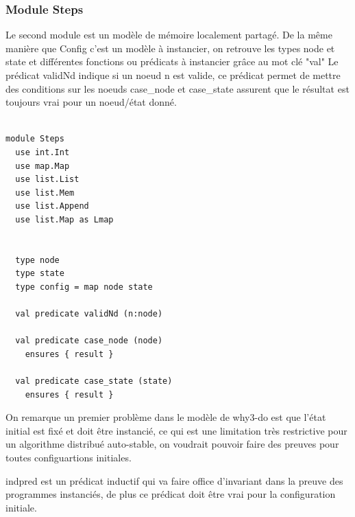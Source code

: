 \documentclass[11pt]{article}
\begin{document}
\subsubsection{Module Steps}
\label{sec:org75f66df}

Le second module est un modèle de mémoire localement partagé.
De la même manière que Config c'est un modèle à instancier,
on retrouve les types node et state et différentes fonctions ou prédicats à instancier grâce au mot clé "val" 
Le prédicat validNd indique si un noeud n est valide, ce prédicat permet de mettre des conditions sur les noeuds 
case\_node et case\_state assurent que le résultat est toujours vrai pour un noeud/état donné.
\lstset{language=why3,label= ,caption= ,captionpos=b,numbers=none}
\begin{lstlisting}

module Steps
  use int.Int
  use map.Map
  use list.List
  use list.Mem
  use list.Append
  use list.Map as Lmap


  type node
  type state
  type config = map node state

  val predicate validNd (n:node)

  val predicate case_node (node)
    ensures { result }

  val predicate case_state (state)
    ensures { result }

\end{lstlisting}

On remarque un premier problème dans le modèle de why3-do est que l'état initial est fixé et 
doit être instancié, ce qui est une limitation très restrictive pour un algorithme distribué auto-stable,
on voudrait pouvoir faire des preuves pour toutes configuartions initiales.

indpred est un prédicat inductif qui va faire office d'invariant dans la preuve des programmes instanciés, 
de plus ce prédicat doit être vrai pour la configuration initiale. 
\end{document}
